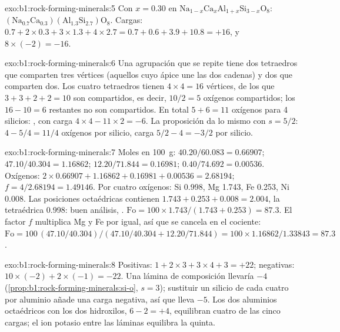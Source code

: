 \begin{solution}{exo:b1:rock-forming-minerals:5}
Con $x = 0.30$ en $\mathrm{Na}_{1-x}\mathrm{Ca}_x\mathrm{Al}_{1+x}\mathrm{Si}_{3-x}\mathrm{O}_8$:
$\mathrm{(Na_{0.7}Ca_{0.3})(Al_{1.3}Si_{2.7})O_8}$. Cargas:
$0.7 + 2\times0.3 + 3\times1.3 + 4\times2.7 = 0.7 + 0.6 + 3.9 + 10.8 = +16$,
y $8\times(-2) = -16$.
\end{solution}

\begin{solution}{exo:b1:rock-forming-minerals:6}
Una agrupación que se repite tiene dos tetraedros que comparten tres vértices (aquellos cuyo ápice une las dos
cadenas) y dos que comparten dos. Los cuatro tetraedros tienen $4\times4 = 16$ vértices, de los que $3 + 3 + 2 + 2 = 10$
son compartidos, es decir, $10/2 = 5$ oxígenos compartidos; los $16 - 10 = 6$ restantes no son compartidos. En total
$5 + 6 = 11$ oxígenos para 4 silicios: , con carga $4\times4 - 11\times2 = -6$. La proposición da lo mismo
con $s = 5/2$: $4 - 5/4 = 11/4$ oxígenos por silicio, carga $5/2 - 4 = -3/2$ por silicio.
\end{solution}

\begin{solution}{exo:b1:rock-forming-minerals:7}
Moles en \qty{100}{g}:  $40.20/60.083 = 0.66907$; 
$47.10/40.304 = 1.16862$;  $12.20/71.844 = 0.16981$; 
$0.40/74.692 = 0.00536$. Oxígenos: $2\times0.66907 + 1.16862 + 0.16981 +
0.00536 = 2.68194$; $f = 4/2.68194 = 1.49146$. Por cuatro oxígenos: Si
\num{0.998}, Mg \num{1.743}, Fe \num{0.253}, Ni \num{0.008}. Las posiciones octaédricas contienen
$1.743 + 0.253 + 0.008 = 2.004$, la tetraédrica \num{0.998}: buen análisis,
.
$\mathrm{Fo} = 100\times1.743/(1.743 + 0.253) = 87.3$. El factor $f$ multiplica Mg y Fe por igual, así que se cancela en
el cociente: $\mathrm{Fo} = 100\,(47.10/40.304)/(47.10/40.304 + 12.20/71.844) =
100\times1.16862/1.33843 = 87.3$.
\end{solution}

\begin{solution}{exo:b1:rock-forming-minerals:8}
Positivas: $1 + 2\times3 + 3\times4 + 3 = +22$; negativas:
$10\times(-2) + 2\times(-1) = -22$. Una lámina de composición  llevaría $-4$
(\cref{prop:b1:rock-forming-minerals:si-o}, $s = 3$); sustituir un silicio de cada cuatro por aluminio añade una
carga negativa, así que  lleva $-5$. Los dos aluminios octaédricos con los dos hidroxilos,
$6 - 2 = +4$, equilibran cuatro de las cinco cargas; el ion potasio entre las láminas equilibra la quinta.
\end{solution}

